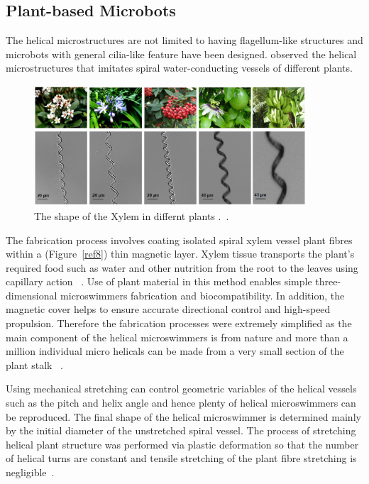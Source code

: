 \documentclass[a4paper,11pt]{article}
\begin{document}
\begin{sloppypar}
\subsection{Plant-based Microbots}

The helical microstructures are not limited to having flagellum-like structures and microbots with
general cilia-like feature have been designed. \citeauthor{gao2013bioinspired}
 observed the helical microstructures that imitates spiral water-conducting vessels of different plants. 

\begin{figure}
  \centering
    \includegraphics[width=0.9\textwidth]{plants}
  \caption{The shape of the Xylem in differnt plants .~\citep{mahoney2011velocity}.}
  \label{plants}
\end{figure}



The fabrication process involves coating isolated spiral xylem vessel plant fibres within a (Figure~\ref{ref8})
thin magnetic layer. Xylem tissue transports the plant\rq{}s required food such as water and other 
nutrition from the root to the leaves using capillary action ~\citep{mahoney2011velocity}.
Use of plant material in this method enables simple three-dimensional microswimmers fabrication 
and biocompatibility. In addition, the magnetic cover helps to ensure accurate directional control and 
high-speed propulsion. Therefore the fabrication processes were extremely simplified as the main 
component of the helical microswimmers is from nature and more than a million individual micro helicals 
can be made from a very small section of the plant stalk ~\citep{mahoney2011velocity}. 


Using mechanical stretching can control geometric variables of the helical vessels such as the pitch and
 helix angle and hence plenty of helical microswimmers can be reproduced. The final shape of the 
helical microswimmer is determined mainly by the initial diameter of the unstretched spiral vessel. The
 process of stretching helical plant structure was performed via plastic deformation so that the number 
of helical turns are constant and tensile stretching of the plant fibre stretching is negligible~\citep{mahoney2011velocity}. 



\end{sloppypar}
\end{document}
